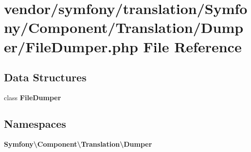 \section{vendor/symfony/translation/\+Symfony/\+Component/\+Translation/\+Dumper/\+File\+Dumper.php File Reference}
\label{_file_dumper_8php}
\subsection*{Data Structures}
\begin{DoxyCompactItemize}
\item 
class {\bf File\+Dumper}
\end{DoxyCompactItemize}
\subsection*{Namespaces}
\begin{DoxyCompactItemize}
\item 
 {\bf Symfony\textbackslash{}\+Component\textbackslash{}\+Translation\textbackslash{}\+Dumper}
\end{DoxyCompactItemize}
